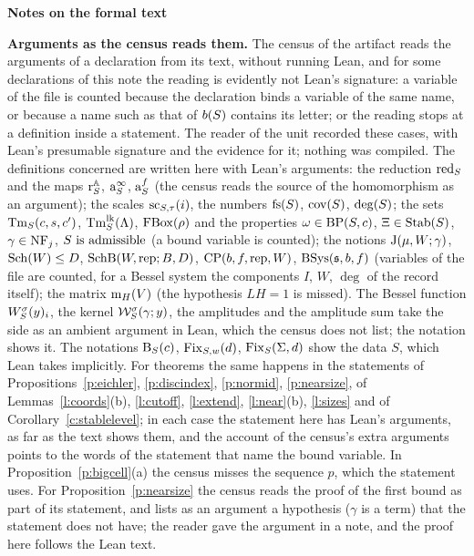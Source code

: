 \documentclass[11pt,a4paper]{article}
\newcommand{\sect}[2]{\refstepcounter{section}\label{#2}\par\addvspace{19pt plus 4pt minus 2pt}\Needspace{7\baselineskip}%
  \noindent\llap{{\fontsize{13.2}{16}\selectfont\bfseries\color{inkfaint}\thesection}\hspace{9pt}}%
  {\fontsize{13.2}{16}\selectfont\bfseries\color{ink}#1}\par\nopagebreak\vspace{-1pt}}
\newcommand{\subhead}[1]{\par\addvspace{9pt plus 2pt}\Needspace{4\baselineskip}\noindent\textbf{#1}\enspace\ignorespaces}
\theoremstyle{plainx}
\theoremstyle{uprightx}
\begin{document}
\sect{Notes on the formal text}{s:notes}
\subhead{Arguments as the census reads them.} The census of the artifact reads the arguments of a declaration from
its text, without running Lean, and for some declarations of this note the reading is evidently not Lean's
signature: a variable of the file is counted because the declaration binds a variable of the same name, or because
a name such as that of $b(S)$ contains its letter; or the reading stops at a definition inside a statement. The
reader of the unit recorded these cases, with Lean's presumable signature and the evidence for it; nothing was
compiled. The definitions concerned are written here with Lean's arguments: the reduction $\mathrm{red}_{S}$ and the maps
$\mathrm{r}^{\mathbb{A}}_{S}$, $\mathrm{a}^{\infty}_{S}$, $\mathrm{a}^{f}_{S}$ (the census reads the source of the homomorphism as an argument); the scales
$\mathrm{sc}_{S,\tau}(i)$, the numbers $\mathrm{fs}(S)$, $\mathrm{cov}(S)$, $\deg(S)$; the sets $\mathrm{Tm}_{S}(c,s,c')$, $\mathrm{Tm}^{\mathrm{lk}}_{S}(\Lambda)$,
$\operatorname{FBox}(\rho)$ and the properties $\omega\in\operatorname{BP}(S,c)$, $\Xi\in\operatorname{Stab}(S)$, $\gamma\in\operatorname{NF}_{j}$, $S\text{ is admissible}$ (a bound variable is
counted); the notions $\mathrm{J}(\mu,W;\gamma)$, $\operatorname{Sch}(W)\le D$, $\operatorname{SchB}(W,\mathrm{rep};B,D)$, $\operatorname{CP}(b,f,\mathrm{rep},W)$,
$\operatorname{BSys}(\mathfrak{s},b,f)$ (variables of the file are counted, for a Bessel system the components $I$, $W$, $\deg$ of the record
itself); the matrix $\mathrm{m}_{H}(V)$ (the hypothesis $LH=1$ is missed). The Bessel function $W^{\sigma}_{S}(y)_{i}$, the kernel
$\mathcal{W}^{\sigma}_{S}(\gamma;y)$, the amplitudes and the amplitude sum take the side as an ambient argument in Lean, which
the census does not list; the notation shows it. The notations $\mathrm{B}_{S}(c)$, $\mathrm{Fix}_{S,w}(d)$, $\mathrm{Fix}_{S}(\Sigma,d)$ show the
data $S$, which Lean takes implicitly. For theorems the same happens in the statements of
Propositions~\ref{p:eichler}, \ref{p:discindex}, \ref{p:normid}, \ref{p:nearsize}, of Lemmas~\ref{l:coords}(b),
\ref{l:cutoff}, \ref{l:extend}, \ref{l:near}(b), \ref{l:sizes} and of Corollary~\ref{c:stablelevel}; in each case
the statement here has Lean's arguments, as far as the text shows them, and the account of the census's extra
arguments points to the words of the statement that name the bound variable. In Proposition~\ref{p:bigcell}(a) the
census misses the sequence $p$, which the statement uses. For Proposition~\ref{p:nearsize} the census reads the
proof of the first bound as part of its statement, and lists as an argument a hypothesis ($\gamma$ is a term) that
the statement does not have; the reader gave the argument in a note, and the proof here follows the Lean text.
\end{document}
